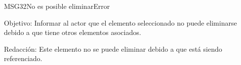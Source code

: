 \begin{mensaje}{MSG32}{No es posible eliminar}{Error}
	\item [Objetivo:] Informar al actor que el elemento seleccionado no puede eliminarse debido a que tiene otros elementos asociados.
	\item[Redacción:] Este elemento no se puede eliminar debido a que está siendo referenciado.
\end{mensaje}